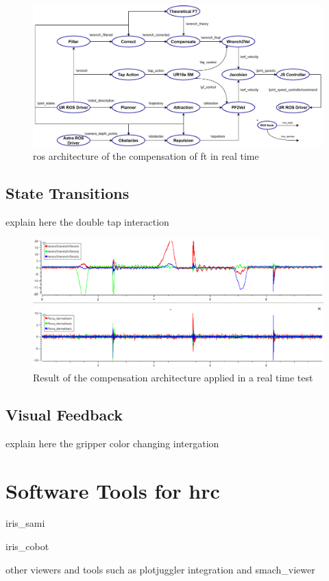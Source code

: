 \begin{figure}[h]
    \centering
    \includegraphics[width=\linewidth]{figs/chp5/ros_cobot_arch.pdf}
    \caption{\ac{ros} architecture of the compensation of \ac{ft} in real time}
    \label{fig:ros_cobot_arch}
\end{figure}


\subsection{State Transitions}

\par explain here the double tap interaction

\begin{figure}[h]
    \centering
    \includegraphics[width=0.9\linewidth]{figs/chp5/taps.png}
    \caption{Result of the compensation architecture applied in a real time test}
    \label{fig:taps}
\end{figure}

\subsection{Visual Feedback}

\par explain here the gripper color changing intergation


\section{Software Tools for \acs{hrc}}
\label{sec:tools-hrc}

\par iris\_sami
\par iris\_cobot
\par other viewers and tools such as plotjuggler integration and smach\_viewer
